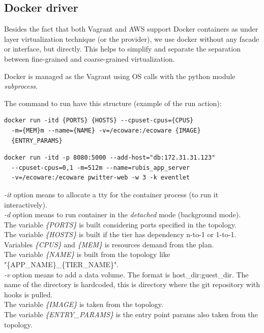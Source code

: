 \subsection{Docker driver}
Besides the fact that both Vagrant and AWS support Docker containers as under layer virtualization technique (or the provider), we use docker without any facade or interface, but directly. This helps to simplify and separate the separation between fine-grained and coarse-grained virtualization.

Docker is managed as the Vagrant using OS calls with the python module \textit{subprocess}.

\begin{sloppypar}The command to run have this structure (example of the run action):\end{sloppypar}

\begin{lstlisting}[caption=Docker run template,basicstyle=\small]
docker run -itd {PORTS} {HOSTS} --cpuset-cpus={CPUS} 
  -m={MEM}m --name={NAME} -v=/ecoware:/ecoware {IMAGE} 
  {ENTRY_PARAMS}
\end{lstlisting}

\begin{lstlisting}[caption=Docker run example,basicstyle=\small]
docker run -itd -p 8080:5000 --add-host="db:172.31.31.123"
  --cpuset-cpus=0,1 -m=512m --name=rubis_app_server 
  -v=/ecoware:/ecoware pwitter-web -w 3 -k eventlet
\end{lstlisting}

\textit{-it} option means to allocate a tty for the container process (to run it interactively).\\
\textit{-d} option means to run container in the \textit{detached} mode (background mode).\\
The variable \textit{\{PORTS\}} is built considering ports specified in the topology.\\
The variable \textit{\{HOSTS\}} is built if the tier has dependency n-to-1 or 1-to-1.\\
Variables \textit{\{CPUS\}} and \textit{\{MEM\}} is resources demand from the plan.\\
The variable \textit{\{NAME\}} is built from the topology like\\ "\{APP\_NAME\}\_\{TIER\_NAME\}".\\
\textit{-v} option means to add a data volume. The format is host\_dir:guest\_dir. The name of the directory is hardcoded, this is directory where the git repository with hooks is pulled.\\
The variable \textit{\{IMAGE\}} is taken from the topology.\\
The variable \textit{\{ENTRY\_PARAMS\}} is the entry point params also taken from the topology.


